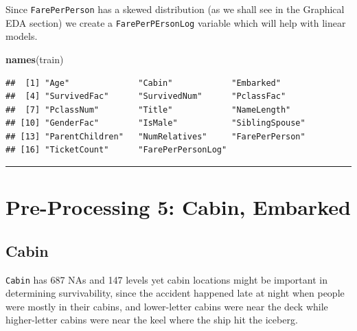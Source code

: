\documentclass[]{article}
\newenvironment{Shaded}{\begin{snugshade}}{\end{snugshade}}
\newcommand{\KeywordTok}[1]{\textcolor[rgb]{0.13,0.29,0.53}{\textbf{#1}}}
\newcommand{\DecValTok}[1]{\textcolor[rgb]{0.00,0.00,0.81}{#1}}
\newcommand{\StringTok}[1]{\textcolor[rgb]{0.31,0.60,0.02}{#1}}
\newcommand{\CommentTok}[1]{\textcolor[rgb]{0.56,0.35,0.01}{\textit{#1}}}
\newcommand{\OperatorTok}[1]{\textcolor[rgb]{0.81,0.36,0.00}{\textbf{#1}}}
\newcommand{\NormalTok}[1]{#1}
\begin{document}
Since \texttt{FarePerPerson} has a skewed distribution (as we shall see
in the Graphical EDA section) we create a \texttt{FarePerPErsonLog}
variable which will help with linear models.

\begin{Shaded}
\end{Shaded}

\begin{Shaded}
\begin{Highlighting}[]
\KeywordTok{names}\NormalTok{(train)}
\end{Highlighting}
\end{Shaded}

\begin{verbatim}
##  [1] "Age"              "Cabin"            "Embarked"        
##  [4] "SurvivedFac"      "SurvivedNum"      "PclassFac"       
##  [7] "PclassNum"        "Title"            "NameLength"      
## [10] "GenderFac"        "IsMale"           "SiblingSpouse"   
## [13] "ParentChildren"   "NumRelatives"     "FarePerPerson"   
## [16] "TicketCount"      "FarePerPersonLog"
\end{verbatim}

\begin{center}\rule{0.5\linewidth}{\linethickness}\end{center}

\section{Pre-Processing 5: Cabin,
Embarked}\label{pre-processing-5-cabin-embarked}

\subsection{Cabin}\label{cabin}

\texttt{Cabin} has 687 NAs and 147 levels yet cabin locations might be
important in determining survivability, since the accident happened late
at night when people were mostly in their cabins, and lower-letter
cabins were near the deck while higher-letter cabins were near the keel
where the ship hit the iceberg.
\end{document}
